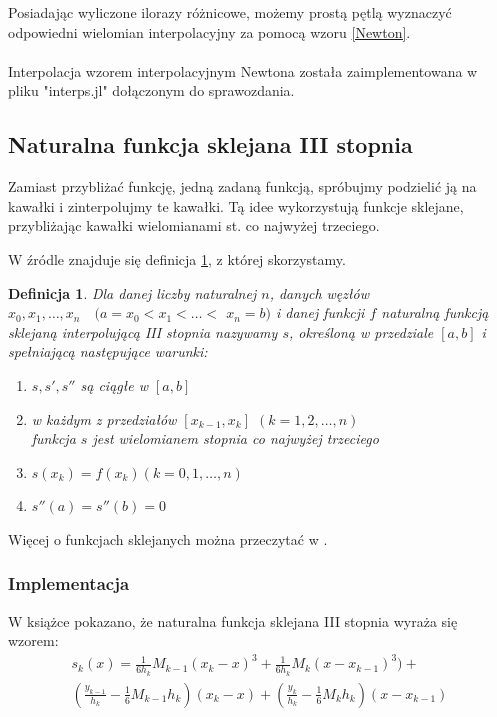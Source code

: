\documentclass{article}
\newtheorem{defi}{Definicja}
\begin{document}
	Posiadając wyliczone ilorazy różnicowe, możemy prostą pętlą wyznaczyć odpowiedni wielomian interpolacyjny za pomocą wzoru \eqref{Newton}. 
	\\\\
	Interpolacja wzorem interpolacyjnym Newtona została zaimplementowana w pliku "interps.jl" dołączonym do sprawozdania.

\subsection{Naturalna funkcja sklejana III stopnia}
	
	Zamiast przybliżać funkcję, jedną zadaną funkcją, spróbujmy podzielić ją na kawałki i zinterpolujmy te kawałki. Tą idee wykorzystują funkcje sklejane, przybliżając kawałki wielomianami st. co najwyżej trzeciego.
	
	W źródle \cite{SLE} znajduje się definicja \ref{Def:Naturalna sklejana}, z której skorzystamy.
	
	\begin{defi}
		\label{Def:Naturalna sklejana}
		Dla danej liczby naturalnej $n$, danych węzłów $x_0,x_1,\dots,x_n \quad(a=x_0 < x_1 < \dots <$ $x_n = b)$ i danej funkcji $f$ naturalną funkcją sklejaną interpolującą III stopnia nazywamy $s$, określoną w przedziale $[a,b]$ i spełniającą następujące warunki:
	
		\begin{enumerate}
			\item $s, s', s''$ są ciągłe w $[a,b]$
			\item w każdym z przedziałów $[x_{k-1},x_k]$ \quad $(k=1,2,\dots,n) $ 
			\\
			funkcja $s$ jest wielomianem stopnia co najwyżej trzeciego
			\item $s(x_k)=f(x_k)$\quad $ (k = 0,1,\dots,n)$ 
			\item $s''(a) = s''(b) = 0$
		\end{enumerate}
	\end{defi}
	
	Więcej o funkcjach sklejanych można przeczytać w \cite{kincaid}.
	
	\subsubsection{Implementacja}
	
	W książce \cite{kincaid} pokazano, że naturalna funkcja sklejana III stopnia wyraża się wzorem: 
	\begin{multline}\label{Wzor: Sklejana}	
	 s_k(x) =  \frac{1}{6h_k}M_{k-1}(x_k-x)^3+\frac{1}{6h_k}M_k(x-x_{k-1})^3) + \\ \left(\frac{y_{k-1}}{h_k}-\frac{1}{6} M_{k-1}h_k \right)(x_k - x) + \left( \frac{y_k}{h_k}-\frac{1}{6} M_{k}h_k\right)(x-x_{k-1}) 
	\end{multline}
	
\end{document}
